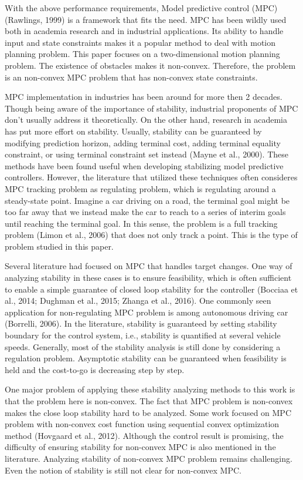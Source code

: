 \documentclass{ifacconf}
\begin{document}
With the above performance requirements, Model predictive control (MPC) (Rawlings, 1999) is a framework that fits the need. MPC has been wildly used both in academia research and in industrial applications. Its ability to handle input and state constraints makes it a popular method to deal with motion planning problem. 
This paper focuses on a two-dimensional motion planning problem. %
The existence of obstacles makes it non-convex. Therefore, the problem is an non-convex MPC problem that has non-convex state constraints. 

MPC implementation in industries has been around for more then 2 decades. Though being aware of the importance of stability, industrial proponents of MPC don't usually address it theoretically. On the other hand, research in academia has put more effort on stability. Usually, stability can be guaranteed by modifying prediction horizon, adding terminal cost, adding terminal equality constraint, or using terminal constraint set instead (Mayne et al., 2000). These methods have been found useful when developing stabilizing model predictive controllers. However, the literature that utilized these techniques often consideres MPC tracking problem as regulating problem, which is regulating around a steady-state point. Imagine a car driving on a road, the terminal goal might be too far away that we instead make the car to reach to a series of interim goals until reaching the terminal goal. In this sense, the problem is a full tracking problem (Limon et al., 2006) that does not only track a point. This  is the type of problem studied in this paper.

Several literature had focused on MPC that handles target changes. One way of analyzing stability in these cases is to ensure feasibility, which is often sufficient to enable a simple guarantee of closed loop stability for the controller (Bocciaa et al., 2014; Dughman et al., 2015; Zhanga et al., 2016). One commonly seen application for non-regulating MPC problem is among autonomous driving car (Borrelli, 2006). In the literature, stability is guaranteed by setting stability boundary for the control system, i.e., stability is quantified at several vehicle speeds. Generally, most of the stability analysis is still done by considering a regulation problem. Asymptotic stability can be guaranteed when feasibility is held and the cost-to-go is decreasing step by step.

One major problem of applying these stability analyzing methods to this work is that the problem here is non-convex. The fact that MPC problem is non-convex makes the close loop stability hard to be analyzed. Some work focused on MPC problem with non-convex cost function using sequential convex optimization method (Hovgaard et al., 2012). Although the control result is promising, the difficulty of ensuring stability for non-convex MPC is also mentioned in the literature. 
Analyzing stability of non-convex MPC problem remains challenging. Even the notion of stability is still not clear for non-convex MPC.
\end{document}
